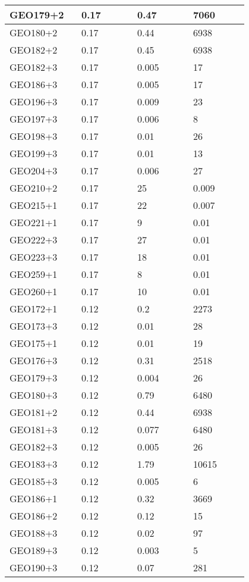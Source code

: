 \begin{longtable}[H]{|p{0.2\linewidth}|p{0.2\linewidth}|p{0.2\linewidth}|p{0.2\linewidth}|}
\hline
GEO179+2 & 0.17 & 0.47 & 7060 \\
\hline
GEO180+2 & 0.17 & 0.44 & 6938 \\
\hline
GEO182+2 & 0.17 & 0.45 & 6938 \\
\hline
GEO182+3 & 0.17 & 0.005 & 17 \\
\hline
GEO186+3 & 0.17 &  0.005 & 17 \\
\hline
GEO196+3 & 0.17 & 0.009 & 23 \\
\hline
GEO197+3 & 0.17 & 0.006 & 8 \\
\hline
GEO198+3 & 0.17 & 0.01 & 26 \\
\hline
GEO199+3 & 0.17 & 0.01 & 13 \\
\hline
GEO204+3 & 0.17 & 0.006 & 27 \\
\hline
GEO210+2 & 0.17 & 25 & 0.009 \\
\hline
GEO215+1 & 0.17 & 22 & 0.007 \\
\hline
GEO221+1 & 0.17 & 9 & 0.01  \\
\hline
GEO222+3 & 0.17 & 27 & 0.01  \\
\hline
GEO223+3 & 0.17 & 18 & 0.01  \\
\hline
GEO259+1 & 0.17 & 8 & 0.01  \\
\hline
GEO260+1 & 0.17 & 10 & 0.01  \\
\hline
GEO172+1 & 0.12 &  0.2 & 2273 \\
\hline
GEO173+3 & 0.12 &  0.01 & 28 \\
\hline
GEO175+1 & 0.12 &  0.01 & 19 \\
\hline
GEO176+3 & 0.12 &  0.31 & 2518 \\
\hline
GEO179+3 & 0.12 &  0.004 & 26 \\
\hline
GEO180+3 & 0.12 &  0.79 & 6480 \\
\hline
GEO181+2 & 0.12 &  0.44 & 6938 \\
\hline
GEO181+3 & 0.12 &  0.077 & 6480 \\
\hline
GEO182+3 & 0.12 &  0.005 & 26 \\
\hline
GEO183+3 & 0.12 &  1.79 & 10615 \\
\hline
GEO185+3 & 0.12 &  0.005 & 6 \\
\hline
GEO186+1 & 0.12 &  0.32 & 3669 \\
\hline
GEO186+2 & 0.12 &  0.12 & 15 \\
\hline
GEO188+3 & 0.12 &  0.02 & 97 \\
\hline
GEO189+3 & 0.12 &  0.003 & 5 \\
\hline
GEO190+3 & 0.12 &  0.07 & 281 \\

\end{longtable}
